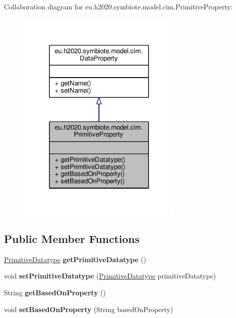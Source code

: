 Collaboration diagram for eu.\+h2020.\+symbiote.\+model.\+cim.\+Primitive\+Property\+:
\nopagebreak
\begin{figure}[H]
\begin{center}
\leavevmode
\includegraphics[width=228pt]{classeu_1_1h2020_1_1symbiote_1_1model_1_1cim_1_1PrimitiveProperty__coll__graph}
\end{center}
\end{figure}
\subsection*{Public Member Functions}
\begin{DoxyCompactItemize}
\item 
\mbox{\label{classeu_1_1h2020_1_1symbiote_1_1model_1_1cim_1_1PrimitiveProperty_a755c83883cb280dd6ef435803f6b60af}} 
\hyperlink{classeu_1_1h2020_1_1symbiote_1_1model_1_1cim_1_1PrimitiveDatatype}{Primitive\+Datatype} {\bfseries get\+Primitive\+Datatype} ()
\item 
\mbox{\label{classeu_1_1h2020_1_1symbiote_1_1model_1_1cim_1_1PrimitiveProperty_abdf8eafda5be452a6852d9cf0f80dda1}} 
void {\bfseries set\+Primitive\+Datatype} (\hyperlink{classeu_1_1h2020_1_1symbiote_1_1model_1_1cim_1_1PrimitiveDatatype}{Primitive\+Datatype} primitive\+Datatype)
\item 
\mbox{\label{classeu_1_1h2020_1_1symbiote_1_1model_1_1cim_1_1PrimitiveProperty_a7cd1f927ebe623d4410023d564d28b13}} 
String {\bfseries get\+Based\+On\+Property} ()
\item 
\mbox{\label{classeu_1_1h2020_1_1symbiote_1_1model_1_1cim_1_1PrimitiveProperty_ad03a192170684b152e1a75400f7f6541}} 
void {\bfseries set\+Based\+On\+Property} (String based\+On\+Property)
\end{DoxyCompactItemize}


